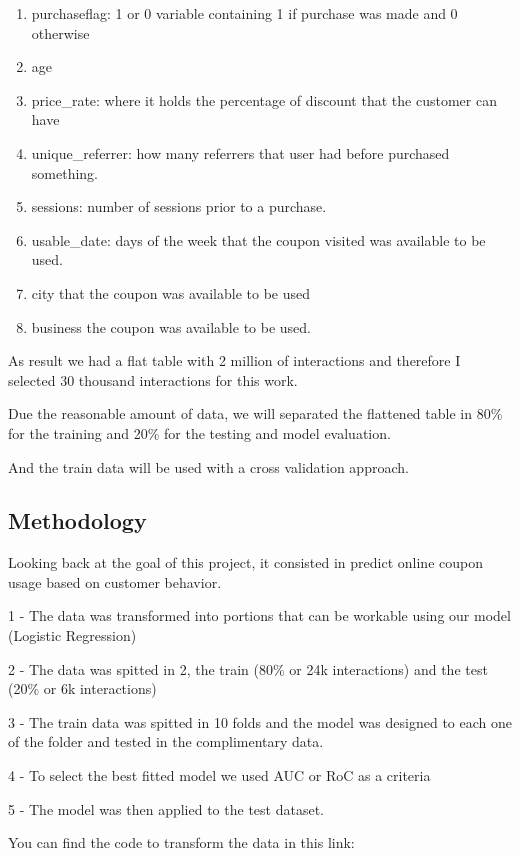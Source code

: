 \documentclass[]{article}
\begin{document}
\begin{enumerate}
\def\labelenumi{\arabic{enumi})}
\item
  purchaseflag: 1 or 0 variable containing 1 if purchase was made and 0
  otherwise
\item
  age
\item
  price\_rate: where it holds the percentage of discount that the
  customer can have
\item
  unique\_referrer: how many referrers that user had before purchased
  something.
\item
  sessions: number of sessions prior to a purchase.
\item
  usable\_date: days of the week that the coupon visited was available
  to be used.
\item
  city that the coupon was available to be used
\item
  business the coupon was available to be used.
\end{enumerate}

As result we had a flat table with 2 million of interactions and
therefore I selected 30 thousand interactions for this work.

Due the reasonable amount of data, we will separated the flattened table
in 80\% for the training and 20\% for the testing and model evaluation.

And the train data will be used with a cross validation approach.

\subsection{Methodology}\label{methodology}

Looking back at the goal of this project, it consisted in predict online
coupon usage based on customer behavior.

1 - The data was transformed into portions that can be workable using
our model (Logistic Regression)

2 - The data was spitted in 2, the train (80\% or 24k interactions) and
the test (20\% or 6k interactions)

3 - The train data was spitted in 10 folds and the model was designed to
each one of the folder and tested in the complimentary data.

4 - To select the best fitted model we used AUC or RoC as a criteria

5 - The model was then applied to the test dataset.

You can find the code to transform the data in this link:
\end{document}
